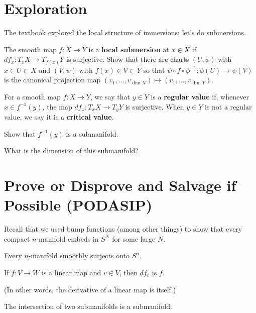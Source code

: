 \documentclass{homework}
\begin{document}
\section{Exploration}

\begin{problem}
  The textbook explored the local structure of immersions; let's do submersions.
  
  The smooth map $f : X \to Y$ is a \textbf{local submersion} at
  $x \in X$ if $df_x : T_x X \to T_{f(x)} Y$ is surjective.  Show that
  there are charts $(U,\phi)$ with $x \in U \subset X$ and $(V,\psi)$
  with $f(x) \in V \subset Y$ so that
  $\psi \circ f \circ \phi^{-1} : \phi(U) \to \psi(V)$ is the
  canonical projection map
  $(v_1,\ldots,v_{\dim X}) \mapsto (v_1,\ldots,v_{\dim Y})$.
\end{problem}

\begin{problem}
  For a smooth map $f : X \to Y$, we say that $y \in Y$ is a
  \textbf{regular value} if, whenever $x \in f^{-1}(y)$, the map
  $df_x : T_x X \to T_y Y$ is surjective.  When $y \in Y$ is not a
  regular value, we say it is a \textbf{critical value}.

  Show that $f^{-1}(y)$ is a submanifold.

  What is the dimension of this submanifold?
\end{problem}


\section{Prove or Disprove and Salvage if Possible (PODASIP)}

Recall that we used bump functions (among other things) to show that
every compact $n$-manifold embeds in $S^N$ for some large $N$.

\begin{problem}
  Every $n$-manifold smoothly surjects onto $S^n$.
\end{problem}

\begin{problem}
  If $f : V \to W$ is a linear map and $v \in V$, then $df_v$ is $f$.

  (In other words, the derivative of a linear map is itself.)
\end{problem}

\begin{problem}
  The intersection of two submanifolds is a submanifold.
\end{problem}
\end{document}
